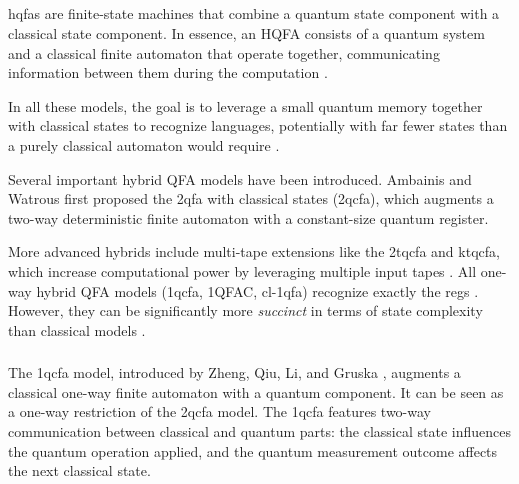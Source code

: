 \subsection{}
\label{sec:hybrid-qfa}

\glspl{hqfa} are finite-state machines that combine a quantum state component with a classical state component. In essence, an HQFA consists of a quantum system and a classical finite automaton that operate together, communicating information between them during the computation \cite{li2015hybrid}.

In all these models, the goal is to leverage a small quantum memory together with classical states to recognize languages, potentially with far fewer states than a purely classical automaton would require \cite{zheng2012one}.

Several important hybrid QFA models have been introduced. Ambainis and Watrous \cite{ambainis2002two} first proposed the \gls{2qfa} with classical states (\gls{2qcfa}), which augments a two-way deterministic finite automaton with a constant-size quantum register. 

More advanced hybrids include multi-tape extensions like the \gls{2tqcfa} and \gls{ktqcfa}, which increase computational power by leveraging multiple input tapes \cite{zheng2011two}. All one-way hybrid QFA models (\gls{1qcfa}, 1QFAC, \gls{cl-1qfa}) recognize exactly the \glspl{reg} \cite{li2015hybrid, zheng2012one}. However, they can be significantly more \textit{succinct} in terms of state complexity than classical models \cite{xiao2021state}.

\subsubsection{}

The \gls{1qcfa} model, introduced by Zheng, Qiu, Li, and Gruska \cite{zheng2012one}, augments a classical one-way finite automaton with a quantum component. It can be seen as a one-way restriction of the \gls{2qcfa} model. The \gls{1qcfa} features two-way communication between classical and quantum parts: the classical state influences the quantum operation applied, and the quantum measurement outcome affects the next classical state.

